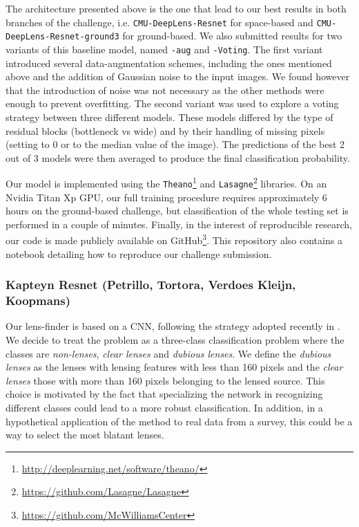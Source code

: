 \documentclass{aa}
\newcommand{\red}[1]{{\color{red} #1}}
\begin{document}
The architecture presented above is the one that lead to our best results in both branches of the challenge, i.e. \texttt{CMU-DeepLens-Resnet} for space-based and \texttt{CMU-DeepLens-Resnet-ground3} for ground-based. We also submitted results for two variants of this baseline model, named \texttt{-aug} and \texttt{-Voting}. 
The first variant introduced several data-augmentation schemes, including the ones mentioned above and the addition of Gaussian noise to the input images. We found however that the introduction of noise was not necessary as the other methods were enough to prevent overfitting. 
The second variant was used to explore a voting strategy between three different models. These models differed by the type of residual blocks (bottleneck vs wide) and by their handling of missing pixels (setting to 0 or to the median value of the image). The predictions of the best 2 out of 3 models were then averaged to produce the final classification probability.


Our model is implemented using the \texttt{Theano}\footnote{\url{http://deeplearning.net/software/theano/}} and \texttt{Lasagne}\footnote{\url{https://github.com/Lasagne/Lasagne}} libraries. On an Nvidia Titan Xp GPU, our full training procedure requires approximately 6 hours on the ground-based challenge, but classification of the whole testing set is performed in a couple of minutes. Finally, in the interest of reproducible research, our code is made publicly available on GitHub\footnote{\url{https://github.com/McWilliamsCenter} }.
This repository also contains a notebook detailing how to reproduce our challenge submission.

\subsubsection{Kapteyn Resnet (Petrillo, Tortora, Verdoes Kleijn, Koopmans) }

Our lens-finder is based on a CNN, following the strategy adopted recently in \citep{2017arXiv170207675P}. 
We decide to treat the problem as a three-class classification problem where the classes are \textit{non-lenses}, \textit{clear lenses} and \textit{dubious lenses}. We define the \textit{dubious lenses} as the lenses with lensing features with less than 160 pixels and the \textit{clear lenses} those with more than 160 pixels belonging to the lensed source. This choice is motivated by the fact that specializing the network in recognizing different classes could lead to a more robust classification. In addition, in a hypothetical application of the method to real data from a survey, this could be a way to select the most blatant lenses.  
\end{document}
